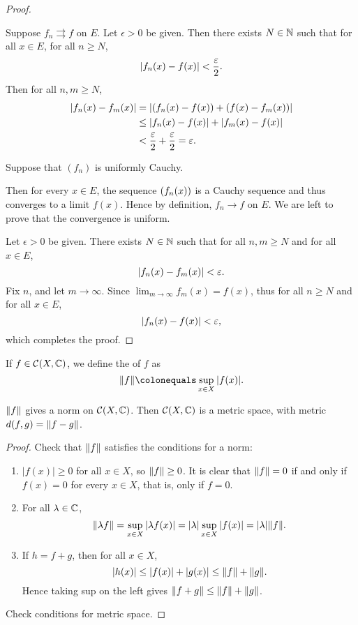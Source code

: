 \begin{proof} \

\fbox{$\implies$} Suppose $f_n\rightrightarrows f$ on $E$. Let $\epsilon>0$ be given. Then there exists $N\in\mathbb N$ such that for all $x\in E$, for all $n\ge N$,
\[\left|f_n(x)-f(x)\right|<\frac{\varepsilon}{2}.\]
Then for all $n,m\ge N$,
\begin{align*}
|f_n(x)-f_m(x)|
&=\left|\left(f_n(x)-f(x)\right)+\left(f(x)-f_m(x)\right)\right|\\
&\le|f_n(x)-f(x)|+|f_m(x)-f(x)|\\
&<\frac{\varepsilon}{2}+\frac{\varepsilon}{2}=\varepsilon.
\end{align*}

\fbox{$\impliedby$} Suppose that $(f_n)$ is uniformly Cauchy.

Then for every $x\in E$, the sequence $\left(f_n(x)\right)$ is a Cauchy sequence and thus converges to a limit $f(x)$. Hence by definition, $f_n\to f$ on $E$. We are left to prove that the convergence is uniform.

Let $\epsilon>0$ be given. There exists $N\in\mathbb N$ such that for all $n,m\ge N$ and for all $x\in E$,
\[\left|f_n(x)-f_m(x)\right|<\varepsilon.\]
Fix $n$, and let $m\to\infty$. Since $\displaystyle\lim_{m\to\infty}f_m(x)=f(x)$, thus for all $n\ge N$ and for all $x\in E$,
\[\left|f_n(x)-f(x)\right|<\varepsilon,\]
which completes the proof.
\end{proof}

\begin{definition}
If $f\in\mathcal{C}(X,\mathbb C)$, we define the  of $f$ as
\[\norm{f}\colonequals\sup_{x\in X}|f(x)|.\]
\end{definition}

\begin{lemma}
$\norm{f}$ gives a norm on $\mathcal{C}(X,\mathbb C)$. Then $\mathcal{C}(X,\mathbb C)$ is a metric space, with metric $d(f,g)=\norm{f-g}$.
\end{lemma}

\begin{proof}
Check that $\norm{f}$ satisfies the conditions for a norm:
\begin{enumerate}[label=(\roman*)]
\item $|f(x)|\ge0$ for all $x\in X$, so $\norm{f}\ge0$. It is clear that $\norm{f}=0$ if and only if $f(x)=0$ for every $x\in X$, that is, only if $f=0$.
\item For all $\lambda\in\mathbb C$,
\[\norm{\lambda f}=\sup_{x\in X}|\lambda f(x)|=|\lambda|\sup_{x\in X}|f(x)|=|\lambda|\norm{f}.\]
\item If $h=f+g$, then for all $x\in X$,
\[|h(x)|\le|f(x)|+|g(x)|\le\norm{f}+\norm{g}.\]
Hence taking sup on the left gives $\norm{f+g}\le\norm{f}+\norm{g}$.
\end{enumerate}
Check conditions for metric space.
\end{proof}

